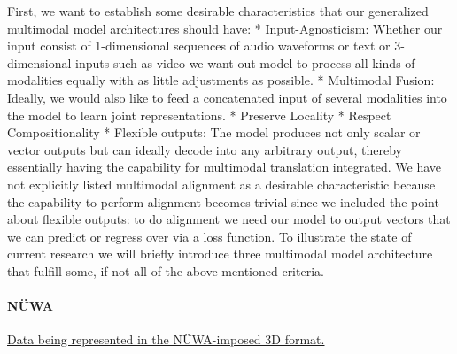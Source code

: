 \documentclass[
]{krantz}
\begin{document}
First, we want to establish some desirable characteristics that our generalized multimodal model architectures should have:
* Input-Agnosticism: Whether our input consist of 1-dimensional sequences of audio waveforms or text or 3-dimensional inputs such as video we want out model to process all kinds of modalities equally with as little adjustments as possible.
* Multimodal Fusion: Ideally, we would also like to feed a concatenated input of several modalities into the model to learn joint representations.
* Preserve Locality
* Respect Compositionality
* Flexible outputs: The model produces not only scalar or vector outputs but can ideally decode into any arbitrary output, thereby essentially having the capability for multimodal translation integrated.
We have not explicitly listed multimodal alignment as a desirable characteristic because the capability to perform alignment becomes trivial since we included the point about flexible outputs: to do alignment we need our model to output vectors that we can predict or regress over via a loss function.
To illustrate the state of current research we will briefly introduce three multimodal model architecture that fulfill some, if not all of the above-mentioned criteria.

\hypertarget{nuxfcwa}{%
\paragraph{NÜWA}\label{nuxfcwa}}

\href{figures/03-01/nuwa.png}{Data being represented in the NÜWA-imposed 3D format\citep{wu2021nwa}.}
\end{document}
